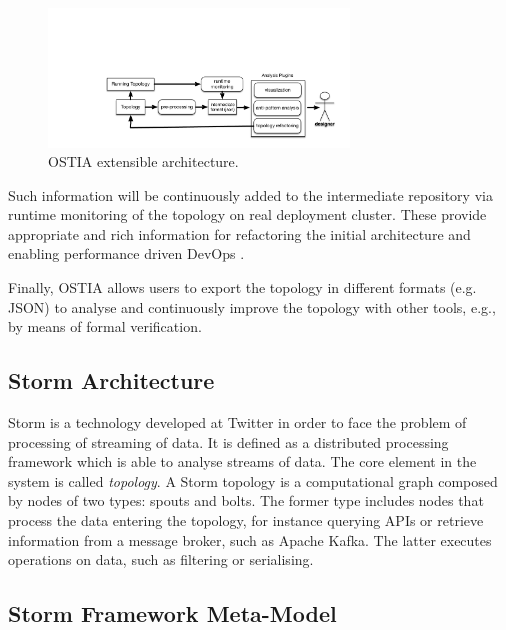\begin{figure}[H]
	\begin{center}
		\includegraphics[width=8cm]{images/ostia-arch}
		\caption{OSTIA extensible architecture.}\label{arch}
	\end{center}
\end{figure}

Such information will be continuously added to the intermediate repository via
runtime monitoring of the topology on real deployment cluster. These provide
appropriate and rich information for refactoring the initial architecture and
enabling performance driven DevOps \cite{brunnert2015performance}.

Finally, OSTIA allows users to export the topology in different formats
(e.g. JSON) to analyse and continuously improve the topology with other tools, e.g., by means of formal verification.

\subsection{Storm Architecture}

Storm is a technology developed at Twitter \cite{toshniwal2014storm} in order to
face the problem of processing of streaming of data. It is defined as a
distributed processing framework which is able to analyse streams of data. The
core element in the system is called \emph{topology}. A Storm topology is a
computational graph composed by nodes of two types: spouts and bolts. The former
type includes nodes that process the data entering the topology, for instance
querying APIs or retrieve information from a message broker, such as Apache
Kafka. The latter executes operations on data, such as filtering or serialising.

\subsection{Storm Framework Meta-Model}

